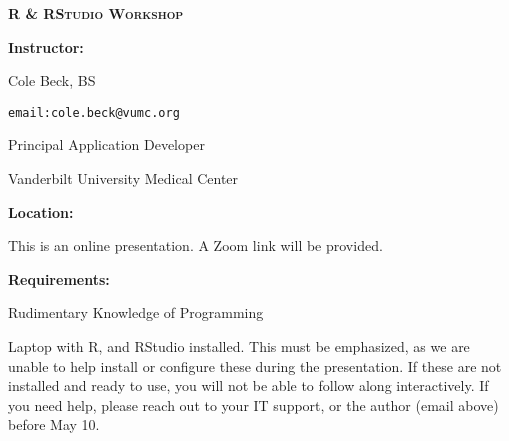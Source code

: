 \documentclass[twocolumn]{article}
\begin{document}
\textbf{\LARGE{\textsc{R \& RStudio Workshop}}}


\vspace*{\fill}

\begin{flushleft}

\textbf{Instructor:}

Cole Beck, BS

\texttt{email:cole.beck@vumc.org}

Principal Application Developer

Vanderbilt University Medical Center
\end{flushleft}

\vspace*{\fill}

\begin{flushleft}
\textbf{Location:}

This is an online presentation. A Zoom link will be provided.
\end{flushleft}

\vspace*{\fill}

\begin{flushleft}

\textbf{Requirements:}

Rudimentary Knowledge of Programming

Laptop with R, and RStudio installed. This must be emphasized, as we are unable to help install or configure these during the presentation. If these are not installed and ready to use, you will not be able to follow along interactively. If you need help, please reach out to your IT support, or the author (email above) before May 10.

\end{flushleft}

\vspace*{\fill}
\end{document}
